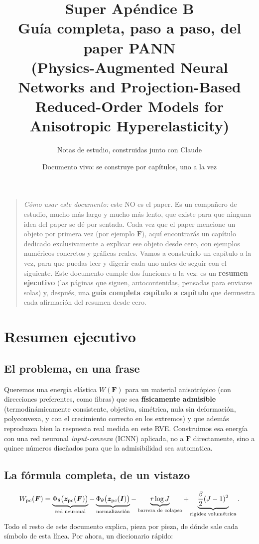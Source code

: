 \documentclass[11pt,a4paper]{article}
\title{Super Ap\'endice B\\
\large Gu\'ia completa, paso a paso, del paper PANN\\
(Physics-Augmented Neural Networks and Projection-Based\\
Reduced-Order Models for Anisotropic Hyperelasticity)}
\author{Notas de estudio, construidas junto con Claude}
\date{Documento vivo: se construye por cap\'itulos, uno a la vez}
\begin{document}
\maketitle

\begin{quote}
\emph{C\'omo usar este documento:} este NO es el paper. Es un compa\~nero
de estudio, mucho m\'as largo y mucho m\'as lento, que existe para que
ninguna idea del paper se dé por sentada. Cada vez que el paper
mencione un objeto por primera vez (por ejemplo $\bm F$), aqu\'i
encontrar\'as un cap\'itulo dedicado exclusivamente a explicar ese
objeto desde cero, con ejemplos num\'ericos concretos y gr\'aficas
reales. Vamos a construirlo un cap\'itulo a la vez, para que puedas
leer y digerir cada uno antes de seguir con el siguiente. Este
documento cumple dos funciones a la vez: es un \textbf{resumen
ejecutivo} (las p\'aginas que siguen, autocontenidas, pensadas para
enviarse solas) y, despu\'es, una \textbf{gu\'ia completa cap\'itulo a
cap\'itulo} que demuestra cada afirmaci\'on del resumen desde cero.
\end{quote}

\section*{Resumen ejecutivo}

\subsection*{El problema, en una frase}

Queremos una energ\'ia el\'astica $W(\bm F)$ para un material
anisotr\'opico (con direcciones preferentes, como fibras) que sea
\textbf{f\'isicamente admisible} (termodin\'amicamente consistente,
objetiva, sim\'etrica, nula sin deformaci\'on, polyconvexa, y con el
crecimiento correcto en los extremos) y que adem\'as reproduzca bien
la respuesta real medida en este RVE. Construimos esa energ\'ia con
una red neuronal \emph{input-convexa} (ICNN) aplicada, no a $\bm F$
directamente, sino a quince n\'umeros dise\~nados para que la
admisibilidad sea automatica.

\subsection*{La f\'ormula completa, de un vistazo}

\begin{equation}
 W_{\rm pc}(\bm F)=\underbrace{\Phi_\theta\big(\bm z_{\rm pc}(\bm F)\big)}_{\text{red neuronal}}
 -\underbrace{\Phi_\theta\big(\bm z_{\rm pc}(\bm I)\big)}_{\text{normalizaci\'on}}
 -\underbrace{r\log J}_{\text{barrera de colapso}}
 +\underbrace{\frac\beta2(J-1)^2}_{\text{rigidez volum\'etrica}}.
 \label{eq:appB-master}
\end{equation}
Todo el resto de este documento explica, pieza por pieza, de d\'onde
sale cada s\'imbolo de esta l\'inea. Por ahora, un diccionario r\'apido:
\end{document}
